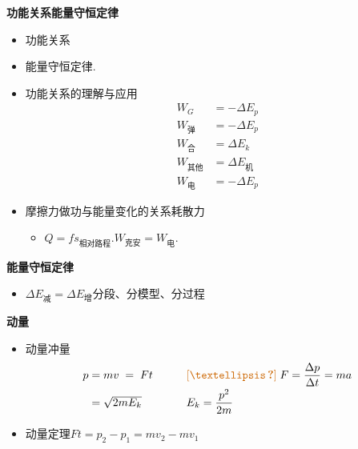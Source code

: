 \textbf{功能关系\quad 能量守恒定律}
\begin{itemize}
\item 功能关系
\item 能量守恒定律.
\end{itemize}
\begin{itemize}
\item 功能关系的理解与应用
  \begin{align*}
  W_{G}&=-\Delta E_p \\ %
  W_{\text{弹}}&=-\Delta E_p \\
  W_{\text{合}}&=\Delta E_k \\
  W_{\text{其他}}&=\Delta E_{\text{机}} \\
  W_{\text{电}}&=-\Delta E_p
  \end{align*}
\item 摩擦力做功与能量变化的关系\quad 耗散力
  \begin{itemize}
  \item $Q=fs_{\text{相对路程}}$.\quad $W_{\text{克安}}=W_{\text{电}}$.
  \end{itemize}
\end{itemize}
\textbf{能量守恒定律}
\begin{itemize}
\item $\Delta E_{\text{减}}=\Delta E_{\text{增}}$\quad 分段、分模型、分过程
\end{itemize}
\textbf{动量}
\begin{itemize}
\item 动量\quad 冲量
  \[
  \begin{array}{ll}
  p=mv\;=\;Ft & \qquad \unclear{…}\;F=\dfrac{\Delta p}{\Delta t}=ma \\[6pt]
  \phantom{p}=\sqrt{2mE_k} & \qquad E_k=\dfrac{p^2}{2m}
  \end{array}
  \]
\item 动量定理\quad $Ft=p_2-p_1=mv_2-mv_1$
\end{itemize}
